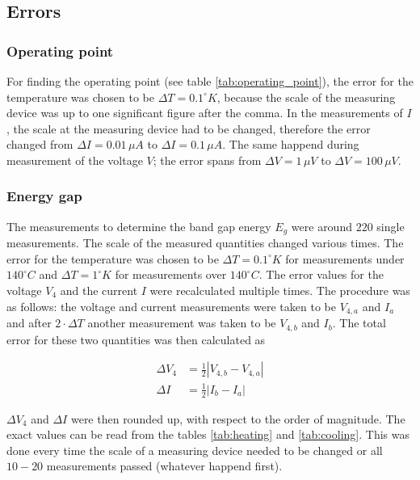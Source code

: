 \documentclass[a4paper]{article}
\begin{document}
\subsection{Errors}

\subsubsection{Operating point}

For finding the operating point (see table \ref{tab:operating_point}), the error for the temperature was chosen to be $\Delta T = 0.1^{\circ}K$, because the scale of the measuring device was up to one significant figure after the comma. In the measurements of $I$, the scale at the measuring device had to be changed, therefore the error changed from $\Delta I = 0.01 \, \mu A$ to $\Delta I = 0.1 \, \mu A$. The same happend during measurement of the voltage $V$; the error spans from $\Delta V = 1 \, \mu V$ to $\Delta V = 100 \, \mu V$.

\subsubsection{Energy gap}

The measurements to determine the band gap energy $E_g$ were around $220$ single measurements. The scale of the measured quantities changed various times. The error for the temperature was chosen to be $\Delta T = 0.1^{\circ}K$ for measurements under $140^{\circ}C$ and $\Delta T = 1^{\circ}K$ for measurements over $140^{\circ}C$. The error values for the voltage $V_4$ and the current $I$ were recalculated multiple times. The procedure was as follows: the voltage and current measurements were taken to be $V_{4,a}$ and $I_a$ and after $2 \cdot \Delta T$ another measurement was taken to be $V_{4,b}$ and $I_b$. The total error for these two quantities was then calculated as

\begin{subequations}
\begin{align}
\Delta V_4 &= \frac{1}{2} | V_{4,b} - V_{4,a} | \\
\Delta I &= \frac{1}{2} | I_b - I_a |
\end{align}
\end{subequations}

$\Delta V_4$ and $\Delta I$ were then rounded up, with respect to the order of magnitude. The exact values can be read from the tables \ref{tab:heating} and \ref{tab:cooling}. This was done every time the scale of a measuring device needed to be changed or all $10-20$ measurements passed (whatever happend first).
\end{document}
